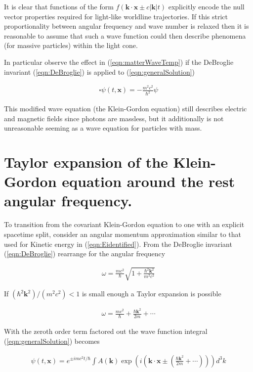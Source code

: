 \documentclass[]{eliblog}
\newcommand{\Abs}[1]{{\left\lvert{#1}\right\rvert}}
\newcommand{\Bk}[0]{\mathbf{k}}
\newcommand{\Bx}[0]{\mathbf{x}}
\newcommand{\delambertian}[0]{\square}
\begin{document}
It is clear that functions of the form $f(\Bk \cdot \Bx \pm c \Abs{\Bk} t)$ explicitly encode the null vector properties required for light-like worldline trajectories.  If this strict proportionality between angular frequency and wave number is relaxed then it is reasonable to assume that such a wave function could then describe phenomena (for massive particles) within the light cone.

In particular observe the effect in (\ref{eqn:matterWaveTemp}) if the DeBroglie invariant (\ref{eqn:DeBroglie}) is applied to (\ref{eqn:generalSolution})

\begin{align}
\delambertian {\psi}(t,\Bx) = -\frac{m^2 c^2}{\hbar^2} \psi
\end{align}

This modified wave equation (the Klein-Gordon equation) still describes electric and magnetic fields since photons are massless, but it additionally is not unreasonable seeming as a wave equation for particles with mass.


\section{Taylor expansion of the Klein-Gordon equation around the rest angular frequency.}

To transition from the covariant Klein-Gordon equation to one with an explicit spacetime split, consider an angular momentum approximation 
similar to that used for Kinetic energy in (\ref{eqn:Eidentified}).  From the DeBroglie invariant (\ref{eqn:DeBroglie}) rearrange for the angular frequency

\begin{align}
\omega = \frac{m c^2}{\hbar} \sqrt{ 1 + \frac{\hbar^2 \Bk^2}{m^2 c^2}}
\end{align}

If $(\hbar^2 \Bk^2)/(m^2 c^2) < 1$ is small enough a Taylor expansion is possible

\begin{align}
\omega = \frac{m c^2}{\hbar} + \frac{\hbar \Bk^2}{2 m} + \cdots
\end{align}

With the zeroth order term factored out the wave function integral (\ref{eqn:generalSolution}) becomes

\begin{align}
{\psi}(t,\Bx) = e^{\pm im c^2 t /\hbar} \int A(\Bk) \exp\left( i \left(\Bk \cdot \Bx \pm \left(\frac{\hbar \Bk^2}{2 m} + \cdots \right) \right) \right) d^3 k
\end{align}
\end{document}
